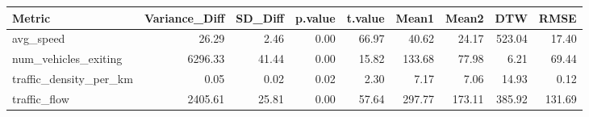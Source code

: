 \begin{table}[ht]
\centering
\begin{tabular}{lrrrrrrrr}
  \hline
Metric & Variance\_Diff & SD\_Diff & p.value & t.value & Mean1 & Mean2 & DTW & RMSE \\ 
  \hline
avg\_speed & 26.29 & 2.46 & 0.00 & 66.97 & 40.62 & 24.17 & 523.04 & 17.40 \\ 
  num\_vehicles\_exiting & 6296.33 & 41.44 & 0.00 & 15.82 & 133.68 & 77.98 & 6.21 & 69.44 \\ 
  traffic\_density\_per\_km & 0.05 & 0.02 & 0.02 & 2.30 & 7.17 & 7.06 & 14.93 & 0.12 \\ 
  traffic\_flow & 2405.61 & 25.81 & 0.00 & 57.64 & 297.77 & 173.11 & 385.92 & 131.69 \\ 
   \hline
\end{tabular}
\end{table}

